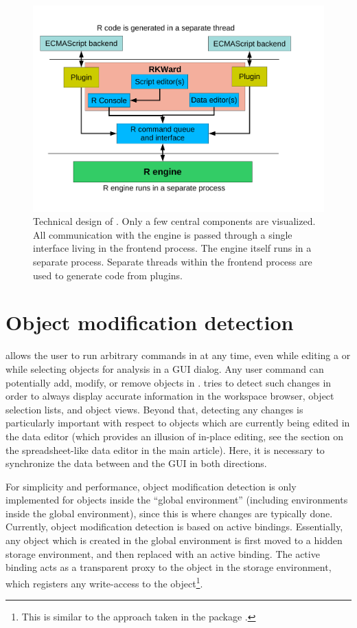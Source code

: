 \documentclass[article,shortnames]{jss}
\begin{document}
\begin{figure}[t!]
 \centering
 \includegraphics[clip=true,trim=0cm 2cm 0cm 0cm]{design_sketch.pdf}
 \caption{Technical design of . Only a few central components are visualized.
 All communication with the  engine is passed through a single interface living in the frontend process. The  engine itself
 runs in a separate process. 
 Separate threads within the frontend process are used to generate  code from plugins.
}
 \label{fig:design_sketch}
\end{figure}

\pagebreak
\section{Object modification detection}
\label{sec:technical_omd}
 allows the user to run arbitrary commands in  at any time, even while
editing a  or while selecting objects for analysis in a GUI dialog. Any user
command can potentially add, modify, or remove objects in .  tries to
detect such changes in order to always display accurate information in the
workspace browser, object selection lists, and object views. Beyond that,
detecting any changes is particularly important with respect to objects which
are currently being edited in the data editor (which provides an illusion
of in-place editing, see the section on the spreadsheet-like data editor in the
main article). Here, it is necessary to synchronize
the data between  and the GUI in both directions.

For simplicity and performance, object modification detection is only
implemented for objects inside the ``global environment'' (including environments
inside the global environment), since this is where changes are typically done.
Currently, object modification detection is based on active bindings.
Essentially, any object which is created in the global environment is first
moved to a hidden storage environment, and then replaced with an active binding.
The active binding acts as a transparent proxy to the object in the storage
environment, which registers any write-access to the object\footnote{
    This is similar to the approach taken in the  package \citep{Plate2009}.
}.
\end{document}
